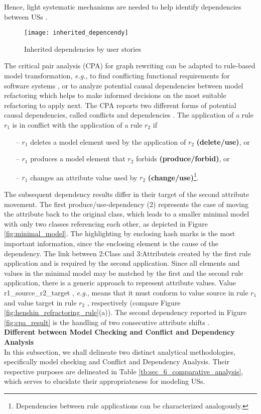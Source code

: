 Hence, light systematic mechanisms are needed to help identify dependencies between USs \cite{gomez2010systematic}.
\begin{figure}
\center
\texttt{[image: inherited\_depencendy]}
\caption{  Inherited dependencies by user stories\cite{gomez2010systematic} }\label{fig:inherited_dependencies}
\end{figure}
The critical pair analysis (CPA) for graph rewriting \cite{hartmanis2006monographs} can be adapted to rule-based model transformation, \emph{e.g.}, to ﬁnd conﬂicting functional requirements for software systems \cite{hausmann2002detection}, or to analyze potential causal dependencies between model refactoring \cite{mens2007analysing} which helps to make informed decisions on the most suitable refactoring to apply next. The CPA reports two diﬀerent forms of potential causal dependencies, called conﬂicts and dependencies \cite{born2015analyzing}.
The application of a rule $r_1$ is in conflict with the application of a rule $r_2$ if
\begin{itemize}
\item[--] $r_1$ deletes a model element used by the application of $r_2$ \textbf{(delete/use)}, or
\item[--] $r_1$ produces a model element that $r_2$ forbids \textbf{(produce/forbid)}, or
\item[--] $r_1$ changes an attribute value used by $r_2$ \textbf{(change/use)}\footnote{Dependencies between rule applications can be characterized analogously.}. 
\end{itemize}
The subsequent dependency results diﬀer in their target of the second attribute movement. The ﬁrst produce/use-dependency (2) represents the case of moving the attribute back to the original class, which leads to a smaller minimal model with only two classes referencing each other, as depicted in Figure \ref{fig:minimal_model}. The highlighting by enclosing hash marks is the most important information, since the enclosing element is the cause of the dependency. The link between 2:Class and 3:Attributeis created by the ﬁrst rule application and is required by the second application. Since all elements and values in the minimal model may be matched by the ﬁrst and the second rule application, there is a generic approach to represent attribute values. Value r1\_source\_r2\_target , \emph{e.g.}, means that it must conform to value source in rule $r_1$ and value target in rule  $r_2$ , respectively (compare Figure \ref{fig:henshin_refractoring_rule}(a)). The second dependency reported in Figure \ref{fig:cpa_result} is the handling of two consecutive attribute shifts \cite{mens2007analysing}.\\ 
\textbf{Different between Model Checking and Conflict and Dependency Analysis}\\ 
In this subsection, we shall delineate two distinct analytical methodologies, specifically model checking and Conflict and Dependency Analysis. Their respective purposes are delineated in Table \ref{tb:sec_6_comparative_analysis}, which serves to elucidate their appropriateness for modeling USs.

